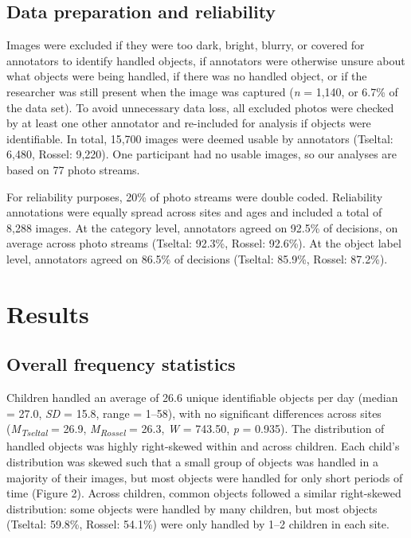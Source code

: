 \documentclass[10pt, letterpaper]{article}
\begin{document}
\hypertarget{data-preparation-and-reliability}{%
\subsection{Data preparation and
reliability}\label{data-preparation-and-reliability}}

Images were excluded if they were too dark, bright, blurry, or covered
for annotators to identify handled objects, if annotators were otherwise
unsure about what objects were being handled, if there was no handled
object, or if the researcher was still present when the image was
captured (\emph{n} = 1,140, or 6.7\% of the data set). To avoid
unnecessary data loss, all excluded photos were checked by at least one
other annotator and re-included for analysis if objects were
identifiable. In total, 15,700 images were deemed usable by annotators
(Tseltal: 6,480, Rossel: 9,220). One participant had no usable images,
so our analyses are based on 77 photo streams.

For reliability purposes, 20\% of photo streams were double coded.
Reliability annotations were equally spread across sites and ages and
included a total of 8,288 images. At the category level, annotators
agreed on 92.5\% of decisions, on average across photo streams (Tseltal:
92.3\%, Rossel: 92.6\%). At the object label level, annotators agreed on
86.5\% of decisions (Tseltal: 85.9\%, Rossel: 87.2\%).

\hypertarget{results}{%
\section{Results}\label{results}}

\hypertarget{overall-frequency-statistics}{%
\subsection{Overall frequency
statistics}\label{overall-frequency-statistics}}

Children handled an average of 26.6 unique identifiable objects per day
(median = 27.0, \emph{SD} = 15.8, range = 1--58), with no significant
differences across sites (\emph{M}\textsubscript{\emph{Tseltal}} = 26.9,
\emph{M}\textsubscript{\emph{Rossel}} = 26.3, \emph{W} = 743.50,
\emph{p} = 0.935). The distribution of handled objects was highly
right-skewed within and across children. Each child's distribution was
skewed such that a small group of objects was handled in a majority of
their images, but most objects were handled for only short periods of
time (Figure 2). Across children, common objects followed a similar
right-skewed distribution: some objects were handled by many children,
but most objects (Tseltal: 59.8\%, Rossel: 54.1\%) were only handled by
1--2 children in each site.
\end{document}
